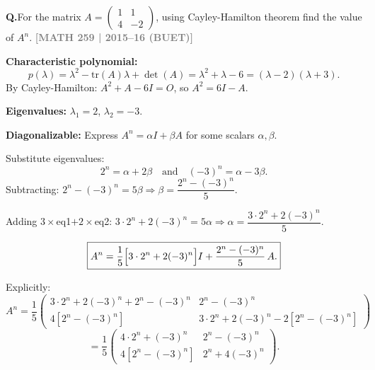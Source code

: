\documentclass[12pt,a3paper]{article}
\newcommand{\yr}[1]{\hfill\textcolor{gray}{\small\textbf{[#1]}}}
\newcounter{qnum}
\newcommand{\Q}[1]{%
  \needspace{4\baselineskip}
  \refstepcounter{qnum}
  \vspace{6pt}
  \noindent\textbf{Q\theqnum.}\enspace #1\par
}
\begin{document}
\Q{For the matrix $A = \begin{pmatrix} 1 & 1 \\ 4 & -2 \end{pmatrix}$, using Cayley-Hamilton theorem find the value of $A^n$.
\yr{MATH 259 | 2015--16 (BUET)}}

\begin{tcolorbox}[enhanced,breakable,
  colback=cA!4,colframe=cA,boxrule=0.8pt,arc=5pt,
  title={\textbf{Answer --- Cayley-Hamilton: $A^n$ for $A=\begin{pmatrix}1&1\\4&-2\end{pmatrix}$}},
  fonttitle=\bfseries\color{white},colbacktitle=cA]
 
\textbf{Characteristic polynomial:}
\[
p(\lambda) = \lambda^2 - \mathrm{tr}(A)\lambda + \det(A) = \lambda^2 + \lambda - 6 = (\lambda-2)(\lambda+3).
\]
By Cayley-Hamilton: $A^2 + A - 6I = O$, so $A^2 = 6I - A$.
 
\textbf{Eigenvalues:} $\lambda_1=2$, $\lambda_2=-3$.
 
\textbf{Diagonalizable:} Express $A^n = \alpha I + \beta A$ for some scalars $\alpha,\beta$.
 
Substitute eigenvalues:
\[
2^n = \alpha + 2\beta \quad\text{and}\quad (-3)^n = \alpha - 3\beta.
\]
Subtracting: $2^n - (-3)^n = 5\beta \Rightarrow \beta = \dfrac{2^n-(-3)^n}{5}$.
 
Adding $3\times$eq1$+2\times$eq2: $3\cdot2^n + 2(-3)^n = 5\alpha \Rightarrow \alpha = \dfrac{3\cdot2^n+2(-3)^n}{5}$.
 
\[
\boxed{A^n = \frac{1}{5}\Bigl[3\cdot2^n+2(-3)^n\Bigr]I + \frac{2^n-(-3)^n}{5}\,A.}
\]
 
Explicitly:
\[
A^n = \frac{1}{5}\begin{pmatrix}3\cdot2^n+2(-3)^n + 2^n-(-3)^n & 2^n-(-3)^n\\ 4[2^n-(-3)^n] & 3\cdot2^n+2(-3)^n-2[2^n-(-3)^n]\end{pmatrix}
\]
\[
= \frac{1}{5}\begin{pmatrix}4\cdot2^n+(-3)^n & 2^n-(-3)^n\\ 4[2^n-(-3)^n] & 2^n+4(-3)^n\end{pmatrix}.
\]
 
\end{tcolorbox}
 
\end{document}
